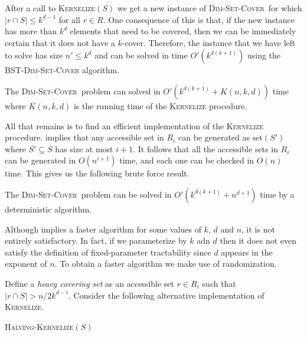 \documentclass[ccfonts,lotsofwhite]{patmorin}
\newcommand{\set}{\mathrm{set}}
\newcommand{\setcover}{\textsc{Dim-Set-Cover}}
\begin{document}
After a call to \textsc{Kernelize}$(S)$ we get a new instance of
\setcover\ for which $|r\cap S|\le k^{d-1}$ for all $r\in R$.  One
consequence of this is that, if the new instance has more than $k^d$
elements that need to be covered, then we can be immediately certain
that it does not have a $k$-cover.  Therefore, the instance that we
have left to solve has size $n'\le k^d$ and can be solved in time
$O'(k^{d(k+1)})$ using the \textsc{BST-\setcover} algorithm.

\begin{lem}
The \setcover\ problem can solved in $O'(k^{d(k+1)}+K(n,k,d))$ time
where $K(n,k,d)$ is the running time of the \textsc{Kernelize}
procedure.
\end{lem}

All that remains is to find an efficient implementation of the
\textsc{Kernelize} procedure.   implies that any
accessible set in $R_i$ can be generated as $\set(S')$ where
$S'\subseteq S$ has size at most $i+1$.  It follows that all the
accessible sets in $R_i$ can be generated in $O(n^{i+1})$ time, and
each one can be checked in $O(n)$ time.  This gives us the following
brute force result.

\begin{thm}
The \setcover\ problem can be solved in $O'(k^{d(k+1)}+n^{d+1})$ time by
a deterministic algorithm.
\end{thm}

Although  implies a faster algorithm for some
values of $k$, $d$ and $n$, it is not entirely satisfactory.  In fact,
if we parameterize by $k$ adn $d$ then it does not even satisfy the
definition of fixed-parameter tractability since $d$ appears in the
exponent of $n$.  To obtain a faster algorithm we make use of
randomization.

Define a \emph{heavy covering set} as an accessible set $r\in R_i$
such that $|r\cap S|> n/2k^{d-i}$.  Consider the following alternative
implementation of \textsc{Kernelize}.

\noindent
\begin{minipage}{\textwidth}
\textsc{Halving-Kernelize}$(S)$
\begin{algorithmic}[1]
    \ENDWHILE
  \ENDFOR
  \ENDIF
\ENDWHILE
\end{algorithmic}
\end{minipage}
\end{document}
